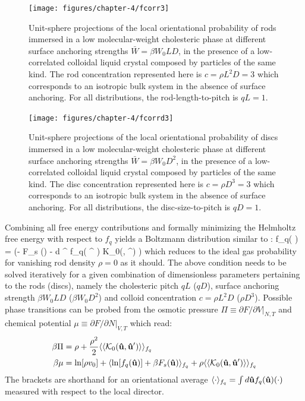 \begin{figure}
	\texttt{[image: figures/chapter-4/fcorr3]}
	\caption{ Unit-sphere projections of the local orientational probability of rods immersed in a low molecular-weight cholesteric phase at different surface anchoring strengths $\bar{W} = \beta W_{0}LD$, in the presence of a low-correlated colloidal liquid crystal composed by particles of the same kind.  The rod concentration represented here is  $c= \rho L^{2} D = 3$ which corresponds to an isotropic bulk system in the absence of surface anchoring. For all distributions, the rod-length-to-pitch is $qL=1$.}
	\label{fcorr3}
\end{figure}

   \begin{figure}
	\texttt{[image: figures/chapter-4/fcorrd3]}
	\caption{ Unit-sphere projections of the local orientational probability of discs immersed in a low molecular-weight cholesteric phase at different surface anchoring strengths $\bar{W} = \beta W_{0}D^2$, in the presence of a low-correlated colloidal liquid crystal composed by particles of the same kind.  The disc concentration represented here is  $c= \rho D^3 = 3$ which corresponds to an isotropic bulk system in the absence of surface anchoring. For all distributions, the disc-size-to-pitch is $qD=1$.}
	\label{fcorrd3}
\end{figure}
Combining all free energy contributions and formally minimizing the Helmholtz free energy with respect to $f_{q}$ yields a Boltzmann distribution similar to :
   \beq
  f_{q}( \bhu ) =  \exp \left (- \beta  F_{s} (\bhu) - \rho \int d \bhu^{\prime} f_{q}( \bhu^{\prime} ) {\mathcal K}_{0}(\bhu, \bhu^{\prime})  \right )
  \label{fcollec}
  \eeq
  which reduces to the ideal gas probability  for vanishing rod density $\rho = 0$ as it should. The above condition needs to be solved iteratively for a given combination of dimensionless parameters pertaining to the rods (discs), namely the  cholesteric pitch $qL$ ($qD$), surface anchoring strength $\beta W_{0}LD$ ($\beta W_{0}D^{2}$) and colloid concentration $c = \rho L^{2}D$ ($\rho D^{3}$). Possible phase transitions can be probed from the osmotic pressure $\Pi \equiv \partial F/\partial V|_{N,T}$ and chemical potential $\mu \equiv \partial F /\partial N|_{V,T}$ which read:
  \begin{align}
  \beta \Pi  &= \rho + \frac{\rho^{2}}{2} \langle \langle {\mathcal K}_{0}({\bf \hat{u}}, {\bf \hat{u}}^{\prime}) \rangle \rangle _{f_{q}} \nonumber \\
  \beta \mu &= \ln [\rho v_{0}] + \langle \ln [f_{q} ({\bf \hat{u}})] + \beta F_{s}({\bf \hat{u}})\rangle_{f_{q}} + \rho \langle \langle {\mathcal K}_{0}({\bf \hat{u}}, {\bf \hat{u}}^{\prime}) \rangle \rangle_{f_{q}}
  \end{align}
  The  brackets are shorthand for an orientational average $ \langle  \cdot  \rangle_{f_{q}} = \int d {\bf \hat{u}}   f_{q}({\bf \hat{u}} )(\cdot)$ measured with respect to the local director.


